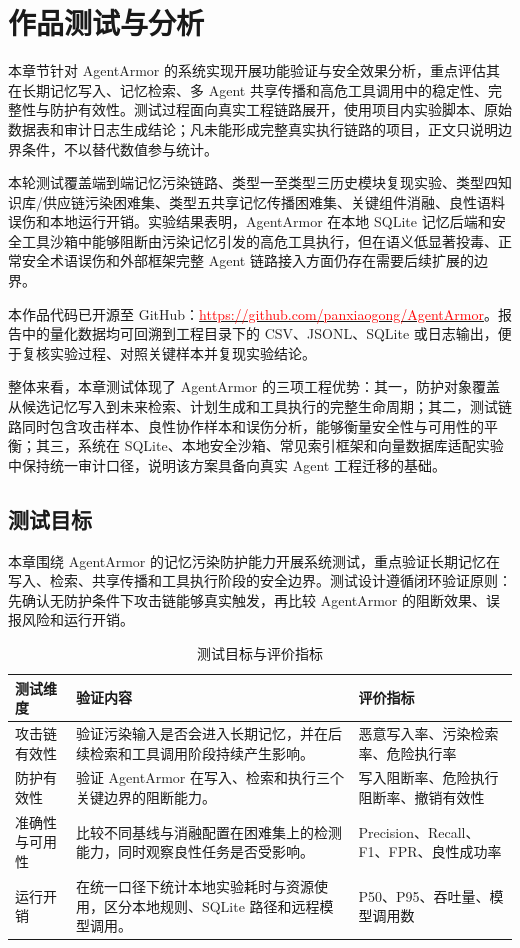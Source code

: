 \documentclass[UTF8,zihao=-4,oneside,fontset=none]{ctexrep}
\begin{document}
	
	\chapter{作品测试与分析}

本章节针对 AgentArmor 的系统实现开展功能验证与安全效果分析，重点评估其在长期记忆写入、记忆检索、多 Agent 共享传播和高危工具调用中的稳定性、完整性与防护有效性。测试过程面向真实工程链路展开，使用项目内实验脚本、原始数据表和审计日志生成结论；凡未能形成完整真实执行链路的项目，正文只说明边界条件，不以替代数值参与统计。

本轮测试覆盖端到端记忆污染链路、类型一至类型三历史模块复现实验、类型四知识库/供应链污染困难集、类型五共享记忆传播困难集、关键组件消融、良性语料误伤和本地运行开销。实验结果表明，AgentArmor 在本地 SQLite 记忆后端和安全工具沙箱中能够阻断由污染记忆引发的高危工具执行，但在语义低显著投毒、正常安全术语误伤和外部框架完整 Agent 链路接入方面仍存在需要后续扩展的边界。

本作品代码已开源至 GitHub：\href{https://github.com/panxiaogong/AgentArmor}{\textcolor{red}{https://github.com/panxiaogong/AgentArmor}}。报告中的量化数据均可回溯到工程目录下的 CSV、JSONL、SQLite 或日志输出，便于复核实验过程、对照关键样本并复现实验结论。

整体来看，本章测试体现了 AgentArmor 的三项工程优势：其一，防护对象覆盖从候选记忆写入到未来检索、计划生成和工具执行的完整生命周期；其二，测试链路同时包含攻击样本、良性协作样本和误伤分析，能够衡量安全性与可用性的平衡；其三，系统在 SQLite、本地安全沙箱、常见索引框架和向量数据库适配实验中保持统一审计口径，说明该方案具备向真实 Agent 工程迁移的基础。

\section{测试目标}

本章围绕 AgentArmor 的记忆污染防护能力开展系统测试，重点验证长期记忆在写入、检索、共享传播和工具执行阶段的安全边界。测试设计遵循闭环验证原则：先确认无防护条件下攻击链能够真实触发，再比较 AgentArmor 的阻断效果、误报风险和运行开销。

\begin{table}[H]
\centering
\caption{测试目标与评价指标}
\small
\setlength{\tabcolsep}{4pt}
\renewcommand{\arraystretch}{1.28}
\begin{tabular}{@{}M{0.18\textwidth}M{0.50\textwidth}M{0.24\textwidth}@{}}
\toprule
测试维度 & 验证内容 & 评价指标 \\
\midrule
攻击链有效性 & 验证污染输入是否会进入长期记忆，并在后续检索和工具调用阶段持续产生影响。 & 恶意写入率、污染检索率、危险执行率 \\
防护有效性 & 验证 AgentArmor 在写入、检索和执行三个关键边界的阻断能力。 & 写入阻断率、危险执行阻断率、撤销有效性 \\
准确性与可用性 & 比较不同基线与消融配置在困难集上的检测能力，同时观察良性任务是否受影响。 & Precision、Recall、F1、FPR、良性成功率 \\
运行开销 & 在统一口径下统计本地实验耗时与资源使用，区分本地规则、SQLite 路径和远程模型调用。 & P50、P95、吞吐量、模型调用数 \\
\bottomrule
\end{tabular}
\end{table}
\end{document}
